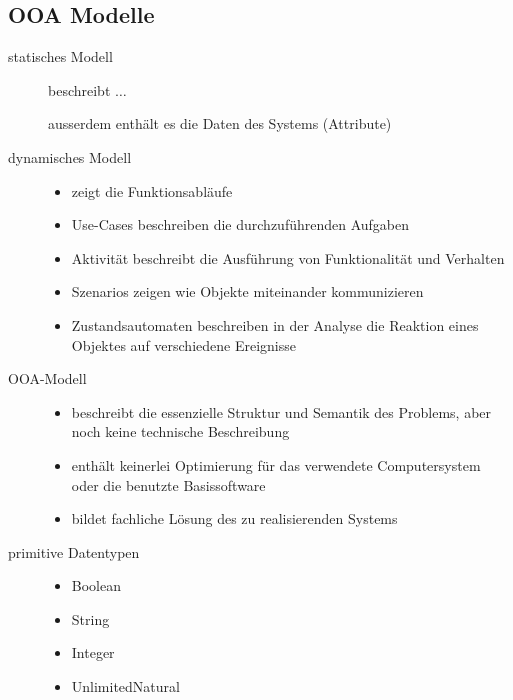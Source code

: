 \subsection{OOA Modelle}
  \begin{description}
    \item[statisches Modell] 
      beschreibt $\ldots$
      ausserdem enthält es die Daten des Systems (Attribute)
     
    \item[dynamisches Modell]
      \begin{itemize}[leftmargin=0.5cm]
        \item zeigt die Funktionsabläufe
        \item Use-Cases beschreiben die durchzuführenden Aufgaben
        \item Aktivität beschreibt die Ausführung von Funktionalität und Verhalten
        \item Szenarios zeigen wie Objekte miteinander kommunizieren
        \item Zustandsautomaten beschreiben in der Analyse die Reaktion eines Objektes auf verschiedene Ereignisse
      \end{itemize}
      
    \item[OOA-Modell]
      \begin{itemize}[leftmargin=0.5cm]
        \item beschreibt die essenzielle Struktur und Semantik des Problems, aber noch keine technische Beschreibung
        \item enthält keinerlei Optimierung für das verwendete Computersystem oder die benutzte Basissoftware
        \item bildet fachliche Lösung des zu realisierenden Systems
      \end{itemize}
      
    \item[primitive Datentypen]
      \begin{itemize}[leftmargin=0.5cm]
        \item Boolean
        \item String
        \item Integer
        \item UnlimitedNatural
      \end{itemize}
  \end{description}
  
